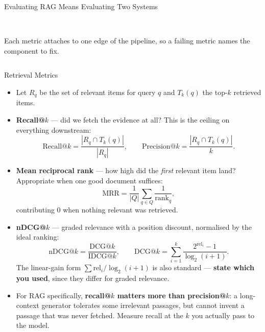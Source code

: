 \begin{frame}{Evaluating RAG Means Evaluating Two Systems}
\begin{columns}[T,onlytextwidth]
\\[0.3em]
      {\scriptsize Each metric attaches to one edge of the pipeline, so a failing metric names the component to fix.}
  \end{columns}
\end{frame}

\begin{frame}{Retrieval Metrics}
  \begin{itemize}\footnotesize\itemsep0.05em
    \item[\textcolor{red}{$\blacktriangleright$}] Let $R_q$ be the set of relevant items for query $q$ and $T_k(q)$ the top-$k$ retrieved items.
    \item[\textcolor{red}{$\blacktriangleright$}] \textbf{Recall@$k$} --- did we fetch the evidence at all? This is the ceiling on everything downstream:
      \[ \text{Recall@}k = \frac{|R_q \cap T_k(q)|}{|R_q|}, \qquad \text{Precision@}k = \frac{|R_q \cap T_k(q)|}{k}. \]
    \item[\textcolor{red}{$\blacktriangleright$}] \textbf{Mean reciprocal rank} --- how high did the \textit{first} relevant item land? Appropriate when one good document suffices:
      \[ \text{MRR} = \frac{1}{|Q|}\sum_{q \in Q} \frac{1}{\text{rank}_q}, \]
      contributing $0$ when nothing relevant was retrieved.
    \item[\textcolor{red}{$\blacktriangleright$}] \textbf{nDCG@$k$} --- graded relevance with a position discount, normalised by the ideal ranking:
      \[ \text{nDCG@}k = \frac{\text{DCG@}k}{\text{IDCG@}k}, \qquad \text{DCG@}k = \sum_{i=1}^{k} \frac{2^{\text{rel}_i} - 1}{\log_2(i+1)}. \]
      The linear-gain form $\sum \text{rel}_i / \log_2(i+1)$ is also standard --- \textbf{state which you used}, since they differ for graded relevance.
    \item[\textcolor{red}{$\blacktriangleright$}] For RAG specifically, \textbf{recall@$k$ matters more than precision@$k$}: a long-context generator tolerates some irrelevant passages, but cannot invent a passage that was never fetched. Measure recall at the $k$ you actually pass to the model.
  \end{itemize}
\end{frame}

